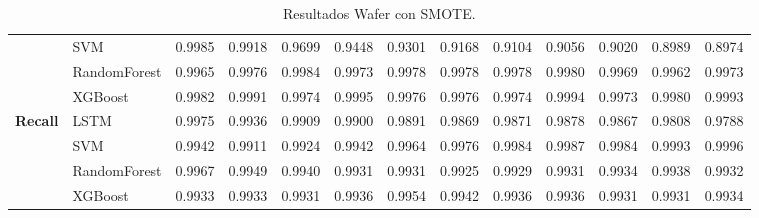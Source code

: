 \begin{table}[h]
\begin{adjustbox}{max width=15cm}
\begin{tabular}{|c|l|r|r|r|r|r|r|r|r|r|r|r|}
			& SVM &  0.9985 &  0.9918 &  0.9699 &  0.9448 &  0.9301 &  0.9168 &  0.9104 &  0.9056 &  0.9020 &  0.8989 &  0.8974 \\
			& RandomForest &  0.9965 &  0.9976 &  0.9984 &  0.9973 &  0.9978 &  0.9978 &  0.9978 &  0.9980 &  0.9969 &  0.9962 &  0.9973 \\
			& XGBoost &  0.9982 &  0.9991 &  0.9974 &  0.9995 &  0.9976 &  0.9976 &  0.9974 &  0.9994 &  0.9973 &  0.9980 &  0.9993 \\
			\hline
			\textbf{Recall} & LSTM &  0.9975 &  0.9936 &  0.9909 &  0.9900 &  0.9891 &  0.9869 &  0.9871 &  0.9878 &  0.9867 &  0.9808 &  0.9788 \\
			& SVM &  0.9942 &  0.9911 &  0.9924 &  0.9942 &  0.9964 &  0.9976 &  0.9984 &  0.9987 &  0.9984 &  0.9993 &  0.9996 \\
			& RandomForest &  0.9967 &  0.9949 &  0.9940 &  0.9931 &  0.9931 &  0.9925 &  0.9929 &  0.9931 &  0.9934 &  0.9938 &  0.9932 \\
			& XGBoost &  0.9933 &  0.9933 &  0.9931 &  0.9936 &  0.9954 &  0.9942 &  0.9936 &  0.9936 &  0.9931 &  0.9931 &  0.9934 \\
			\hline
		\end{tabular}
	\end{adjustbox}
	\caption{Resultados Wafer con SMOTE.}
	\label{tab:Wafer_SMOTE}
\end{table}
